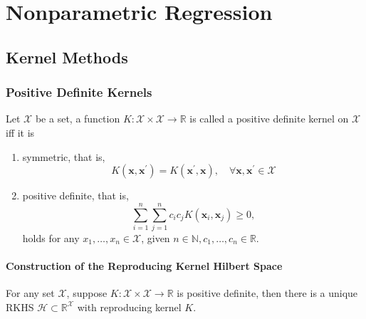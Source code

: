 \chapter{Nonparametric Regression}

\section{Kernel Methods}

\subsection{Positive Definite Kernels}

\begin{definition}
    Let $\mathcal{X}$ be a set, a function $K:\mathcal{X}\times\mathcal{X}\rightarrow\mathbb{R}$ is called a positive definite kernel on $\mathcal{X}$ iff it is
    \begin{enumerate}
        \item symmetric, that is,
              \begin{equation}
                  K\left(\mathbf{x},\mathbf{x}^{\prime}\right)=K\left(\mathbf{x}^{\prime},\mathbf{x}\right),\quad\forall\mathbf{x},\mathbf{x}^{\prime}\in\mathcal{X}
              \end{equation}
        \item positive definite, that is,
              \begin{equation}
                  \sum_{i=1}^{n}\sum_{j=1}^{n}c_{i}c_{j}K\left(\mathbf{x}_{i},\mathbf{x}_{j}\right)\geq 0,
              \end{equation}
              holds for any $x_{1},\ldots,x_{n}\in\mathcal{X}$, given $n\in\mathbb{N},c_{1},\ldots,c_{n}\in\mathbb{R}$.
    \end{enumerate}
\end{definition}

\subsubsection{Construction of the Reproducing Kernel Hilbert Space}

\begin{theorem} \label{thm:morse-aronszajn}
    For any set $\mathcal{X}$, suppose $K:\mathcal{X}\times\mathcal{X}\rightarrow\mathbb{R}$ is positive definite, then there is a unique RKHS $\mathcal{H}\subset\mathbb{R}^{\mathcal{X}}$ with reproducing kernel $K$.
\end{theorem}


